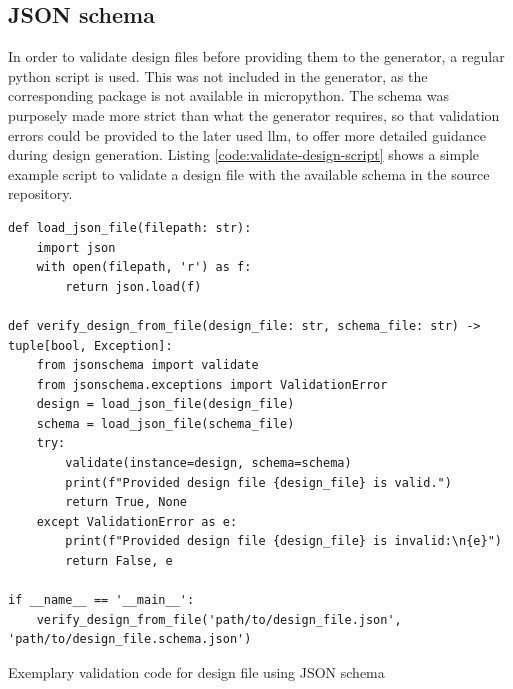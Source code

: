 \documentclass[Bachelor, BIC, english, fhCitStyle, IEEE]{BASE/twbook} %
\begin{document}
\subsection{JSON schema}
In order to validate design files before providing them to the generator, a regular python script is used. This was not included in the generator, as the corresponding package is not available in micropython. The schema was purposely made more strict than what the generator requires, so that validation errors could be provided to the later used \ac{llm}, to offer more detailed guidance during design generation.
Listing \ref{code:validate-design-script} shows a simple example script to validate a design file with the available schema \autocite{UidetectorSchemaDesign_file} in the source repository.
\begin{listing}[htbp]
    \begin{verbatim}
def load_json_file(filepath: str):
    import json
    with open(filepath, 'r') as f:
        return json.load(f)

def verify_design_from_file(design_file: str, schema_file: str) -> tuple[bool, Exception]:
    from jsonschema import validate
    from jsonschema.exceptions import ValidationError
    design = load_json_file(design_file)
    schema = load_json_file(schema_file)
    try:
        validate(instance=design, schema=schema)
        print(f"Provided design file {design_file} is valid.")
        return True, None
    except ValidationError as e:
        print(f"Provided design file {design_file} is invalid:\n{e}")
        return False, e

if __name__ == '__main__':
    verify_design_from_file('path/to/design_file.json', 'path/to/design_file.schema.json')
    \end{verbatim}
    \caption{Exemplary validation code for design file using JSON schema}
    \label{code:validate-design-script}
\end{listing}
\clearpage
\end{document}
